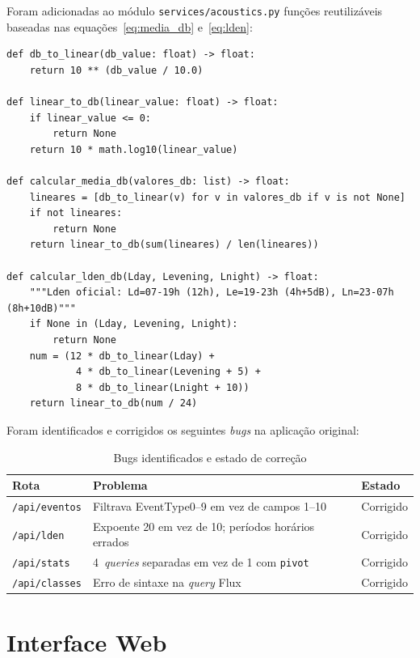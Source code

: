 \documentclass[12pt,a4paper]{report}
\begin{document}
Foram adicionadas ao módulo \texttt{services/acoustics.py} funções reutilizáveis baseadas nas equações~\eqref{eq:media_db} e~\eqref{eq:lden}:

\begin{lstlisting}[style=python, caption={Funções de cálculo acústico correto (acoustics.py)}]
def db_to_linear(db_value: float) -> float:
    return 10 ** (db_value / 10.0)

def linear_to_db(linear_value: float) -> float:
    if linear_value <= 0:
        return None
    return 10 * math.log10(linear_value)

def calcular_media_db(valores_db: list) -> float:
    lineares = [db_to_linear(v) for v in valores_db if v is not None]
    if not lineares:
        return None
    return linear_to_db(sum(lineares) / len(lineares))

def calcular_lden_db(Lday, Levening, Lnight) -> float:
    """Lden oficial: Ld=07-19h (12h), Le=19-23h (4h+5dB), Ln=23-07h (8h+10dB)"""
    if None in (Lday, Levening, Lnight):
        return None
    num = (12 * db_to_linear(Lday) +
            4 * db_to_linear(Levening + 5) +
            8 * db_to_linear(Lnight + 10))
    return linear_to_db(num / 24)
\end{lstlisting}

Foram identificados e corrigidos os seguintes \textit{bugs} na aplicação original:

\begin{table}[H]
\centering\small
\caption{Bugs identificados e estado de correção}
\begin{tabular}{lll}
\toprule
\textbf{Rota} & \textbf{Problema} & \textbf{Estado} \\
\midrule
\texttt{/api/eventos}  & Filtrava EventType0--9 em vez de campos 1--10 & Corrigido \\
\texttt{/api/lden}     & Expoente 20 em vez de 10; períodos horários errados & Corrigido \\
\texttt{/api/stats}    & 4~\textit{queries} separadas em vez de 1 com \texttt{pivot} & Corrigido \\
\texttt{/api/classes}  & Erro de sintaxe na \textit{query} Flux & Corrigido \\
\bottomrule
\end{tabular}
\end{table}

\section{Interface Web}
\label{sec:webmelhorias}
\end{document}
